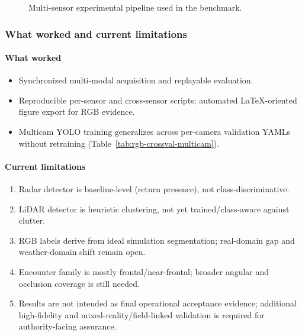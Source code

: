 \begin{figure}[ht]
  \centering
  \caption{Multi-sensor experimental pipeline used in the benchmark.}
  \label{fig:multisensor-pipeline}
\end{figure}

\subsubsection{What worked and current limitations}
\paragraph{What worked}
\begin{itemize}
  \item Synchronized multi-modal acquisition and replayable evaluation.
  \item Reproducible per-sensor and cross-sensor scripts; automated LaTeX-oriented figure export for RGB evidence.
  \item Multicam YOLO training generalizes across per-camera validation YAMLs without retraining (Table~\ref{tab:rgb-crossval-multicam}).
\end{itemize}

\paragraph{Current limitations}
\begin{enumerate}
  \item Radar detector is baseline-level (return presence), not class-discriminative.
  \item LiDAR detector is heuristic clustering, not yet trained/class-aware against clutter.
  \item RGB labels derive from ideal simulation segmentation; real-domain gap and weather-domain shift remain open.
  \item Encounter family is mostly frontal/near-frontal; broader angular and occlusion coverage is still needed.
  \item Results are not intended as final operational acceptance evidence; additional high-fidelity and mixed-reality/field-linked validation is required for authority-facing assurance.
\end{enumerate}

